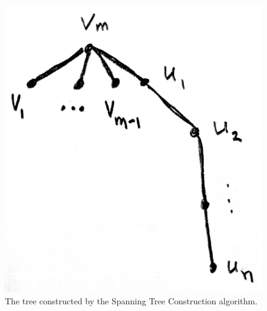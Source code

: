 \documentclass{article}
\begin{document}
\begin{figure}
    \centering
    \includegraphics[width=\linewidth]{tree}
    \caption{The tree constructed by the Spanning Tree Construction algorithm.}
    \label{fig:tree}
\end{figure}
\end{document}
